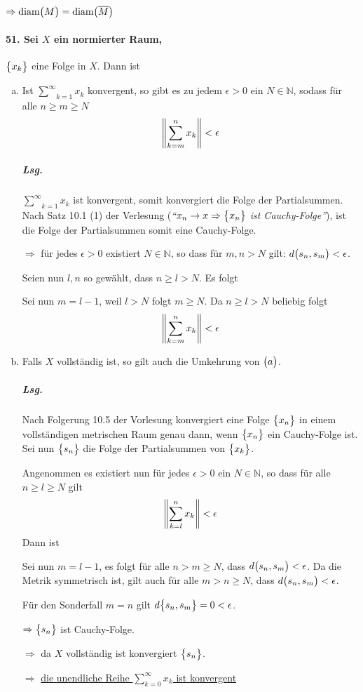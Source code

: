 \documentclass{scrreprt}
\newcommand\diam{\text{diam}}
\begin{document}
$\Rightarrow \diam\qty\big(M) = \diam\qty\big(\overline{M})$

\newpage
\paragraph{51. Sei $X$ ein normierter Raum,} $\qty\big{x_k}$ eine Folge in $X$.
Dann ist
\begin{enumerate}[(a)]
\item Ist $\underset{k = 1}{\overset{\infty}{\sum}} x_k$ konvergent, so gibt
  es zu jedem $\epsilon > 0$ ein $N \in \mathbb{N}$, sodass für alle
  $n \geq m \geq N$
  \[
    \norm{\sum_{k = m}^n x_k} < \epsilon
  \]

  \subparagraph{Lsg.} $\underset{k = 1}{\overset{\infty}{\sum}} x_k$ ist
  konvergent, somit konvergiert die Folge der Partialsummen.
  Nach Satz 10.1 (1) der Verlesung (\emph{``$x_n \to x \Rightarrow \qty\big{x_n}$
    ist Cauchy-Folge''}), ist die Folge der Partialsummen somit eine
  Cauchy-Folge.

  $\Rightarrow$ für jedes $\epsilon > 0$ existiert $N \in \mathbb{N}$, so dass
  für $m, n > N$ gilt: $d\qty\big(s_n, s_m) < \epsilon$.

  Seien nun $l, n$ so gewählt, dass $n \geq l > N$.
  Es folgt
  Sei nun $m = l - 1$, weil $l > N$ folgt $m \geq N$.
  Da $n \geq l > N$ beliebig folgt
  \[
    \norm{\sum_{k = m}^n x_k} < \epsilon
  \]

\item Falls $X$ vollständig ist, so gilt auch die Umkehrung von $\qty\big(a)$.

  \subparagraph{Lsg.} Nach Folgerung 10.5 der Vorlesung konvergiert eine Folge
  $\qty\big{x_n}$ in einem vollständigen metrischen Raum genau dann, wenn
  $\qty\big{x_n}$ ein Cauchy-Folge ist.
  Sei nun $\qty\big{s_n}$ die Folge der Partialsummen von $\qty\big{x_k}$.

  Angenommen es existiert nun für jedes $\epsilon > 0$ ein $N \in \mathbb{N}$,
  so dass für alle $n \geq l \geq N$ gilt
  \[
    \norm{\sum_{k = l}^n x_k} < \epsilon
  \]
  Dann ist
 Sei nun $m = l - 1$, es folgt für alle $n > m \geq N$, dass
 $d\qty\big(s_n, s_m) < \epsilon$.
 Da die Metrik symmetrisch ist, gilt auch für alle $m > n \geq N$, dass
 $d\qty\big(s_n, s_m) < \epsilon$.

 Für den Sonderfall $m = n$ gilt $d\qty\big{s_n, s_m} = 0 < \epsilon$.

 $\Rightarrow \qty\big{s_n}$ ist Cauchy-Folge.

 $\Rightarrow$ da $X$ vollständig ist konvergiert $\qty\big{s_n}$.

 $\Rightarrow$ \underline{die unendliche Reihe $\sum_{k = 0}^{\infty} x_k$ ist
   konvergent}
\end{enumerate}
\end{document}
